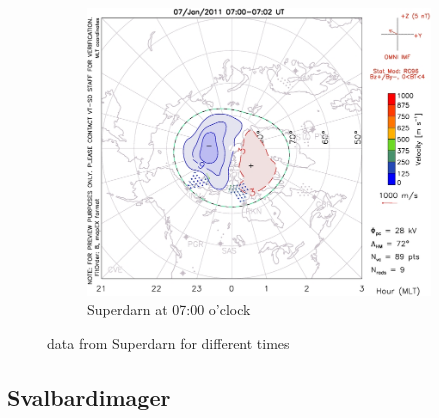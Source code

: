 \documentclass[10pt,a4paper]{article}
\begin{document}
\begin{figure}[h]
\begin{subfigure}{0.3\textwidth}
	\includegraphics[width=\textwidth]{Superdarn14.jpg}
	\caption{ Superdarn at 07:00 o'clock \label{Super_07}}
\end{subfigure}
\caption{data from Superdarn for different times}
\end{figure}

\subsection{Svalbardimager}
\end{document}
